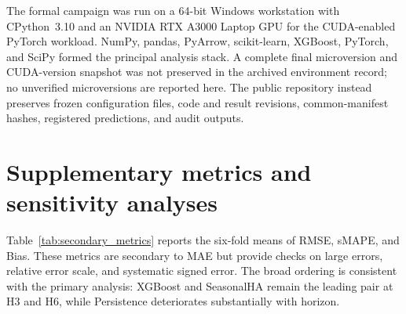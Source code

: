 \documentclass[pdflatex,sn-basic,Numbered]{sn-jnl}
\begin{document}
The formal campaign was run on a 64-bit Windows workstation with CPython~3.10 and an NVIDIA RTX A3000 Laptop GPU for the CUDA-enabled PyTorch workload. NumPy, pandas, PyArrow, scikit-learn, XGBoost, PyTorch, and SciPy formed the principal analysis stack. A complete final microversion and CUDA-version snapshot was not preserved in the archived environment record; no unverified microversions are reported here. The public repository instead preserves frozen configuration files, code and result revisions, common-manifest hashes, registered predictions, and audit outputs.

\section{Supplementary metrics and sensitivity analyses}
\label{app:sensitivity}

Table~\ref{tab:secondary_metrics} reports the six-fold means of RMSE, sMAPE, and Bias. These metrics are secondary to MAE but provide checks on large errors, relative error scale, and systematic signed error. The broad ordering is consistent with the primary analysis: XGBoost and SeasonalHA remain the leading pair at H3 and H6, while Persistence deteriorates substantially with horizon.
\end{document}
